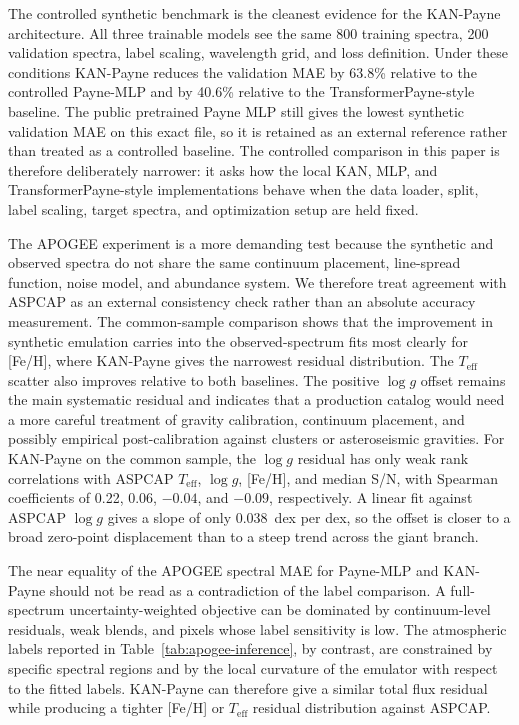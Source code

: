 \documentclass[universe,article,submit,pdftex,moreauthors]{Definitions/mdpi}
\begin{document}
The controlled synthetic benchmark is the cleanest evidence for the KAN-Payne
architecture. All three trainable models see the same 800 training spectra, 200
validation spectra, label scaling, wavelength grid, and loss definition. Under
these conditions KAN-Payne reduces the validation MAE by 63.8\% relative to the
controlled Payne-MLP and by 40.6\% relative to the TransformerPayne-style
baseline. The public pretrained Payne MLP still gives the lowest synthetic
validation MAE on this exact file, so it is retained as an external reference
rather than treated as a controlled baseline. The controlled comparison in this
paper is therefore deliberately narrower: it asks how the local KAN, MLP, and
TransformerPayne-style implementations behave when the data loader, split,
label scaling, target spectra, and optimization setup are held fixed.

The APOGEE experiment is a more demanding test because the synthetic and
observed spectra do not share the same continuum placement, line-spread
function, noise model, and abundance system. We therefore treat agreement with
ASPCAP as an external consistency check rather than an absolute accuracy
measurement. The common-sample comparison shows that the improvement in
synthetic emulation carries into the observed-spectrum fits most clearly for
[Fe/H], where KAN-Payne gives the narrowest residual distribution. The
$T_{\mathrm{eff}}$ scatter also improves relative to both baselines. The
positive $\log g$ offset remains the main systematic residual and indicates
that a production catalog would need a more careful treatment of gravity
calibration, continuum placement, and possibly empirical post-calibration
against clusters or asteroseismic gravities.
For KAN-Payne on the common sample, the $\log g$ residual has only weak
rank correlations with ASPCAP $T_{\mathrm{eff}}$, $\log g$, [Fe/H], and median
S/N, with Spearman coefficients of 0.22, 0.06, $-0.04$, and $-0.09$,
respectively. A linear fit against ASPCAP $\log g$ gives a slope of only
0.038~dex per dex, so the offset is closer to a broad zero-point displacement
than to a steep trend across the giant branch.

The near equality of the APOGEE spectral MAE for Payne-MLP and KAN-Payne should
not be read as a contradiction of the label comparison. A full-spectrum
uncertainty-weighted objective can be dominated by continuum-level residuals,
weak blends, and pixels whose label sensitivity is low. The atmospheric labels
reported in Table~\ref{tab:apogee-inference}, by contrast, are constrained by
specific spectral regions and by the local curvature of the emulator with
respect to the fitted labels. KAN-Payne can therefore give a similar total flux
residual while producing a tighter [Fe/H] or $T_{\mathrm{eff}}$ residual
distribution against ASPCAP.
\end{document}
